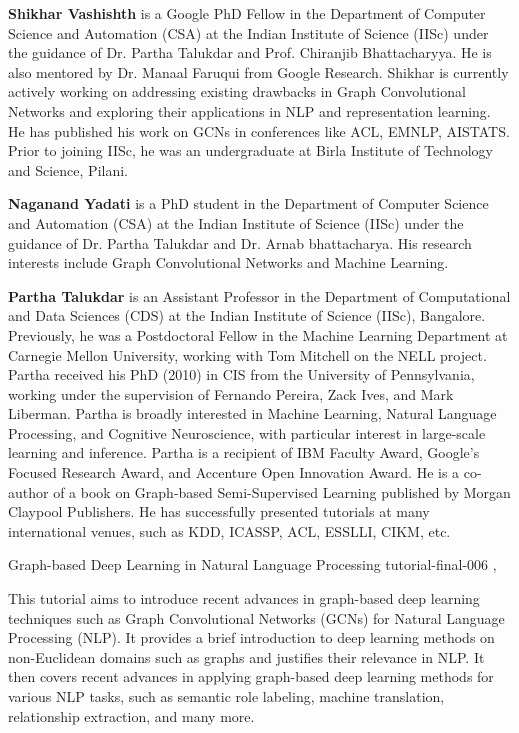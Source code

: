 \begin{bio}

\textbf{Shikhar Vashishth} is a Google PhD Fellow in the Department of Computer Science and Automation (CSA) at the Indian Institute of Science (IISc) under the guidance of Dr. Partha Talukdar and Prof. Chiranjib Bhattacharyya. He is also mentored by Dr. Manaal Faruqui from Google Research. Shikhar is currently actively working on addressing existing drawbacks in Graph Convolutional Networks and exploring their applications in NLP and representation learning. He has published his work on GCNs in conferences like ACL, EMNLP, AISTATS. Prior to joining IISc, he was an undergraduate at Birla Institute of Technology and Science, Pilani. 

\textbf{Naganand Yadati} is a PhD student in the Department of Computer Science and Automation
(CSA) at the Indian Institute of Science (IISc) under the guidance of Dr. Partha Talukdar and
Dr. Arnab bhattacharya. His research interests include Graph Convolutional Networks and
Machine Learning.


\textbf{Partha Talukdar}  is an Assistant Professor in the Department of Computational and Data Sciences (CDS) at the Indian Institute of Science (IISc), Bangalore. Previously, he was a Postdoctoral Fellow in the Machine Learning Department at Carnegie Mellon University, working with Tom Mitchell on the NELL project. Partha received his PhD (2010) in CIS from the University of Pennsylvania, working under the supervision of Fernando Pereira, Zack Ives, and Mark Liberman. Partha is broadly interested in Machine Learning, Natural Language Processing, and Cognitive Neuroscience, with particular interest in large-scale learning and inference. Partha is a recipient of IBM Faculty Award, Google's Focused Research Award, and Accenture Open Innovation Award. He is a co-author of a book on Graph-based Semi-Supervised Learning published by Morgan Claypool Publishers. He has successfully presented tutorials at many international venues, such as KDD, ICASSP, ACL, ESSLLI, CIKM, etc.

\end{bio}

\begin{tutorial}
  {Graph-based Deep Learning in Natural Language Processing}
  {tutorial-final-006}
  {\daydateyear, \tutorialafternoontime}
  {\TutLocF}

This tutorial aims to introduce recent advances in graph-based deep learning techniques such as Graph Convolutional Networks (GCNs) for Natural Language Processing (NLP). It provides a brief introduction to deep learning methods on non-Euclidean domains such as graphs and justifies their relevance in NLP. It then covers recent advances in applying graph-based deep learning methods for various NLP tasks, such as semantic role labeling, machine translation, relationship extraction, and many more.

\end{tutorial}
